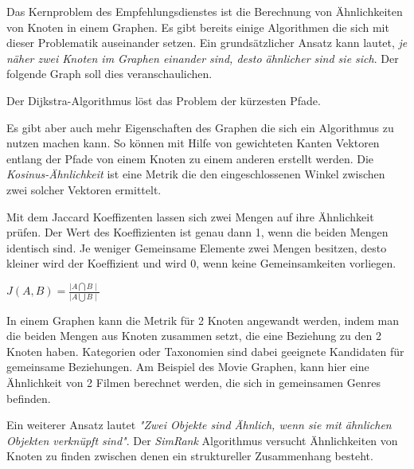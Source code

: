 Das Kernproblem des Empfehlungsdienstes ist die Berechnung von Ähnlichkeiten von Knoten in einem Graphen. Es gibt bereits einige Algorithmen die sich mit dieser Problematik auseinander setzen. Ein grundsätzlicher Ansatz kann lautet,\textit{ je näher zwei Knoten im Graphen einander sind, desto ähnlicher sind sie sich}. Der folgende Graph soll dies veranschaulichen. 

Der Dijkstra-Algorithmus löst das Problem der kürzesten Pfade.

Es gibt aber auch mehr Eigenschaften des Graphen die sich ein Algorithmus zu nutzen machen kann. So können mit Hilfe von gewichteten Kanten Vektoren entlang der Pfade von einem Knoten zu einem anderen erstellt werden. Die \textit{Kosinus-Ähnlichkeit} ist eine Metrik die den eingeschlossenen Winkel zwischen zwei solcher Vektoren ermittelt.


Mit dem Jaccard Koeffizenten lassen sich zwei Mengen auf ihre Ähnlichkeit prüfen. Der Wert des Koeffizienten ist  genau dann 1, wenn die beiden Mengen identisch sind. Je weniger Gemeinsame Elemente zwei Mengen besitzen, desto kleiner wird der  Koeffizient und wird 0, wenn keine Gemeinsamkeiten vorliegen.
\begin{center}
	$ J(A,B)=\frac{\mid A\bigcap B\mid }{ \mid A \bigcup B \mid }$

\end{center}
In einem Graphen kann die Metrik für 2 Knoten angewandt werden, indem man die beiden Mengen aus Knoten zusammen setzt, die eine Beziehung zu den 2 Knoten haben. Kategorien oder Taxonomien sind dabei geeignete Kandidaten für gemeinsame Beziehungen. Am Beispiel des Movie Graphen, kann hier eine Ähnlichkeit von 2 Filmen berechnet werden, die sich in gemeinsamen Genres befinden. 

Ein weiterer Ansatz lautet \textit{"Zwei Objekte sind Ähnlich, wenn sie mit ähnlichen Objekten verknüpft sind"}. Der \textit{SimRank} Algorithmus versucht Ähnlichkeiten von Knoten zu finden zwischen denen ein struktureller Zusammenhang besteht. 


